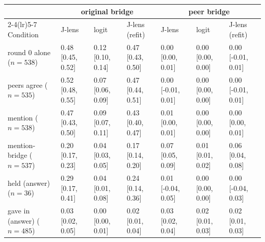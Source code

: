 \begin{tabular}{lllllll}
\toprule
 & \multicolumn{3}{c}{original bridge} & \multicolumn{3}{c}{peer bridge} \\
\cmidrule(lr){2-4}\cmidrule(lr){5-7}
Condition & J-lens & logit & J-lens (refit) & J-lens & logit & J-lens (refit) \\
\midrule
round 0 alone ($n{=}538$) & 0.48 [0.45, 0.52] & 0.12 [0.10, 0.14] & 0.47 [0.43, 0.50] & 0.00 [0.00, 0.01] & 0.00 [0.00, 0.00] & 0.00 [-0.01, 0.01] \\
peers agree ($n{=}535$) & 0.52 [0.48, 0.55] & 0.07 [0.06, 0.09] & 0.47 [0.44, 0.51] & 0.00 [-0.01, 0.01] & 0.00 [0.00, 0.00] & 0.00 [-0.01, 0.01] \\
mention ($n{=}538$) & 0.47 [0.43, 0.50] & 0.09 [0.07, 0.11] & 0.43 [0.40, 0.47] & 0.01 [0.00, 0.01] & 0.00 [0.00, 0.00] & 0.00 [0.00, 0.01] \\
mention-bridge ($n{=}537$) & 0.20 [0.17, 0.23] & 0.04 [0.03, 0.05] & 0.17 [0.14, 0.20] & 0.07 [0.05, 0.09] & 0.01 [0.01, 0.02] & 0.06 [0.04, 0.08] \\
held (answer) ($n{=}36$) & 0.29 [0.17, 0.41] & 0.04 [0.01, 0.08] & 0.24 [0.14, 0.36] & 0.01 [-0.04, 0.05] & 0.00 [0.00, 0.00] & 0.00 [-0.04, 0.03] \\
gave in (answer) ($n{=}485$) & 0.03 [0.02, 0.05] & 0.00 [0.00, 0.01] & 0.02 [0.01, 0.04] & 0.03 [0.02, 0.04] & 0.02 [0.01, 0.03] & 0.02 [0.01, 0.03] \\
\bottomrule
\end{tabular}
